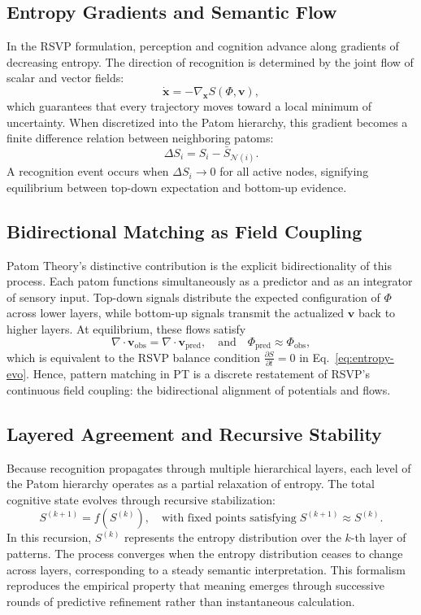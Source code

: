 \documentclass[11pt]{article}
\begin{document}
\subsection{Entropy Gradients and Semantic Flow}
In the RSVP formulation, perception and cognition advance along gradients of decreasing entropy. The direction of recognition is determined by the joint flow of scalar and vector fields:
\[
\dot{\mathbf{x}} = -\nabla_{\!\mathbf{x}} S(\Phi,\mathbf{v}),
\]
which guarantees that every trajectory moves toward a local minimum of uncertainty. When discretized into the Patom hierarchy, this gradient becomes a finite difference relation between neighboring patoms:
\[
\Delta S_i = S_i - \bar{S}_{\mathcal{N}(i)}.
\]
A recognition event occurs when $\Delta S_i \!\to\! 0$ for all active nodes, signifying equilibrium between top-down expectation and bottom-up evidence.

\subsection{Bidirectional Matching as Field Coupling}
Patom Theory’s distinctive contribution is the explicit bidirectionality of this process. Each patom functions simultaneously as a predictor and as an integrator of sensory input. Top-down signals distribute the expected configuration of $\Phi$ across lower layers, while bottom-up signals transmit the actualized $\mathbf{v}$ back to higher layers. At equilibrium, these flows satisfy
\[
\nabla\!\cdot\!\mathbf{v}_{\mathrm{obs}} =
\nabla\!\cdot\!\mathbf{v}_{\mathrm{pred}},
\quad\text{and}\quad
\Phi_{\mathrm{pred}} \approx \Phi_{\mathrm{obs}},
\]
which is equivalent to the RSVP balance condition $\frac{\partial S}{\partial t} = 0$ in Eq.~\eqref{eq:entropy-evo}. Hence, pattern matching in PT is a discrete restatement of RSVP’s continuous field coupling: the bidirectional alignment of potentials and flows.

\subsection{Layered Agreement and Recursive Stability}
Because recognition propagates through multiple hierarchical layers, each level of the Patom hierarchy operates as a partial relaxation of entropy. The total cognitive state evolves through recursive stabilization:
\[
S^{(k+1)} = f(S^{(k)}), \quad
\text{with fixed points satisfying}\;
S^{(k+1)} \!\approx\! S^{(k)}.
\]
In this recursion, $S^{(k)}$ represents the entropy distribution over the $k$-th layer of patterns. The process converges when the entropy distribution ceases to change across layers, corresponding to a steady semantic interpretation. This formalism reproduces the empirical property that meaning emerges through successive rounds of predictive refinement rather than instantaneous calculation.
\end{document}
